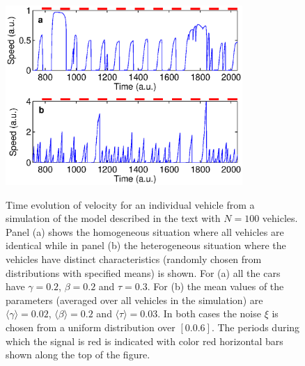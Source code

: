 \documentclass[conference]{IEEEtran}
\begin{document}
\begin{figure}
{\includegraphics[width=9.0cm, angle=0]{figures/fig3_v4.eps}}
\caption{Time evolution of velocity for an individual
vehicle from a simulation of the model described in the text with $N =
100$ vehicles. Panel (a) shows the homogeneous
situation where all vehicles are identical while in panel (b) the
heterogeneous situation where
the vehicles have distinct characteristics (randomly chosen from
distributions with specified means) is shown.
For (a) all the cars have $\gamma=0.2$, $\beta=0.2$ and $\tau=0.3$.
For (b) the mean values of the parameters (averaged over all vehicles
in the simulation) are
$\langle \gamma \rangle =0.02$, $\langle \beta \rangle =0.2$ and
$\langle \tau \rangle =0.03$. In both cases the noise $\xi$ is chosen
from a uniform distribution over $[0.0.6]$. The periods during which the
signal is red is indicated with color red horizontal bars shown along
the top of the figure.}

    \label{vel_t}
\end{figure}
\end{document}
